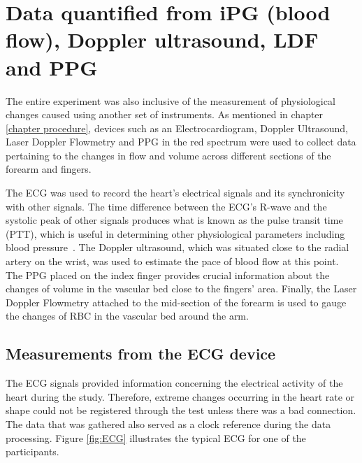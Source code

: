 
\chapter{Data quantified from iPG (blood flow), Doppler ultrasound, LDF and PPG}  %
\label{chapter data collection}

\ifpdf
\graphicspath{{Chapter8/Figs/Raster/}{Chapter8/Figs/PDF/}{Chapter8/Figs/}}
\else
\graphicspath{{Chapter8/Figs/Vector/}{Chapter8/Figs/}}
\fi

The entire experiment was also inclusive of the measurement of physiological changes caused using another set of instruments. As mentioned in chapter \ref{chapter procedure}, devices such as an Electrocardiogram, Doppler Ultrasound, Laser Doppler Flowmetry and PPG in the red spectrum were used to collect data pertaining to the changes in flow and volume across different sections of the forearm and fingers. 

The ECG was used to record the heart's electrical signals and its synchronicity with other signals. The time difference between the ECG's R-wave and the systolic peak of other signals produces what is known as the pulse transit time (PTT), which is useful in determining other physiological parameters including blood pressure~\cite{liu2017cuffless}. The Doppler ultrasound, which was situated close to the radial artery on the wrist, was used to estimate the pace of blood flow at this point. The PPG placed on the index finger provides crucial information about the changes of volume in the vascular bed close to the fingers' area. Finally, the Laser Doppler Flowmetry attached to the mid-section of the forearm is used to gauge the changes of RBC in the vascular bed around the arm. 

\section{Measurements from the ECG device}
\label{section comparison 1}
The ECG signals provided information concerning the electrical activity of the heart during the study. Therefore, extreme changes occurring in the heart rate or shape could not be registered through the test unless there was a bad connection. The data that was gathered also served as a clock reference during the data processing. Figure \ref{fig:ECG} illustrates the typical ECG for one of the participants.

